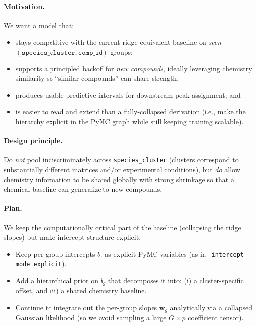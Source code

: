 \documentclass[11pt]{article}
\begin{document}
\paragraph{Motivation.}
We want a model that:
\begin{itemize}
  \item stays competitive with the current ridge-equivalent baseline on \emph{seen} $(\texttt{species\_cluster}, \texttt{comp\_id})$ groups;
  \item supports a principled backoff for \emph{new compounds}, ideally leveraging chemistry similarity so ``similar compounds'' can share strength;
  \item produces usable predictive intervals for downstream peak assignment; and
  \item is easier to read and extend than a fully-collapsed derivation (i.e., make the hierarchy explicit in the PyMC graph while
        still keeping training scalable).
\end{itemize}

\paragraph{Design principle.}
Do \emph{not} pool indiscriminately across \texttt{species\_cluster} (clusters correspond to substantially different matrices and/or
experimental conditions), but \emph{do} allow chemistry information to be shared globally with strong shrinkage so that a chemical baseline
can generalize to new compounds.

\paragraph{Plan.}
We keep the computationally critical part of the baseline (collapsing the ridge slopes) but make intercept structure explicit:
\begin{itemize}
  \item Keep per-group intercepts $b_g$ as explicit PyMC variables (as in \texttt{--intercept-mode explicit}).
  \item Add a hierarchical prior on $b_g$ that decomposes it into:
        (i) a cluster-specific offset, and (ii) a shared chemistry baseline.
  \item Continue to integrate out the per-group slopes $\bm{w}_g$ analytically via a collapsed Gaussian likelihood (so we avoid sampling
        a large $G \times p$ coefficient tensor).
\end{itemize}
\end{document}

